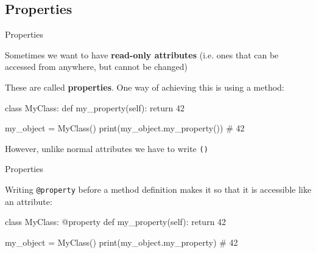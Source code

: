 \subsection{Properties}

\begin{frame}[fragile]{Properties}

    Sometimes we want to have {\bf read-only attributes} (i.e. ones that can be accessed from anywhere, but cannot be changed)

    \vspace{1em}

    These are called {\bf properties}. One way of achieving this is using a method:

    \begin{pythoncode}
    class MyClass:
        def my_property(self):
            return 42

    my_object = MyClass()
    print(my_object.my_property())  # 42
    \end{pythoncode}

    However, unlike normal attributes we have to write {\tt ()}

\end{frame}

\begin{frame}[fragile]{Properties}

    Writing {\tt @property} before a method definition makes it so that it is accessible like an attribute:

    \vspace{1em}

    \begin{pythoncode}
    class MyClass:
        @property
        def my_property(self):
            return 42

    my_object = MyClass()
    print(my_object.my_property)  # 42
    \end{pythoncode}


\end{frame}


